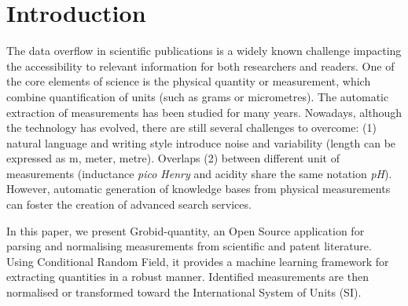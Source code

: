 \documentclass[sigconf]{acmart}
\begin{document}


\maketitle

\section{Introduction}

The data overflow in scientific publications is a widely known challenge impacting the accessibility to relevant information for both researchers and readers. 
One of the core elements of science is the physical quantity or measurement, which combine quantification of units (such as grams or micrometres). The automatic extraction of measurements has been studied for many years. Nowadays, although the technology has evolved, there are still several challenges to overcome: (1) natural language and writing style introduce noise and variability (length can be expressed as m, meter, metre). Overlaps (2) between different unit of measurements (inductance \textit{pico Henry} and acidity share the same notation \textit{pH}). However, automatic generation of knowledge bases from physical measurements can foster the creation of advanced search services. 

In this paper, we present Grobid-quantity, an Open Source application \cite{grobid-quantities} for parsing and normalising measurements from scientific and patent literature. Using Conditional Random Field, it provides a machine learning framework for extracting quantities in a robust manner. Identified measurements are then normalised or transformed toward the International System of Units (SI). 
\end{document}
